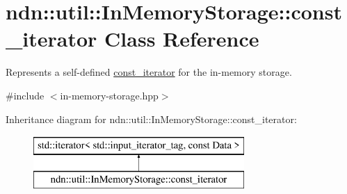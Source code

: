 \hypertarget{classndn_1_1util_1_1InMemoryStorage_1_1const__iterator}{}\section{ndn\+:\+:util\+:\+:In\+Memory\+Storage\+:\+:const\+\_\+iterator Class Reference}
\label{classndn_1_1util_1_1InMemoryStorage_1_1const__iterator}


Represents a self-\/defined \hyperlink{classndn_1_1util_1_1InMemoryStorage_1_1const__iterator}{const\+\_\+iterator} for the in-\/memory storage.  




{\ttfamily \#include $<$in-\/memory-\/storage.\+hpp$>$}

Inheritance diagram for ndn\+:\+:util\+:\+:In\+Memory\+Storage\+:\+:const\+\_\+iterator\+:\begin{figure}[H]
\begin{center}
\leavevmode
\includegraphics[height=2.000000cm]{classndn_1_1util_1_1InMemoryStorage_1_1const__iterator}
\end{center}
\end{figure}

